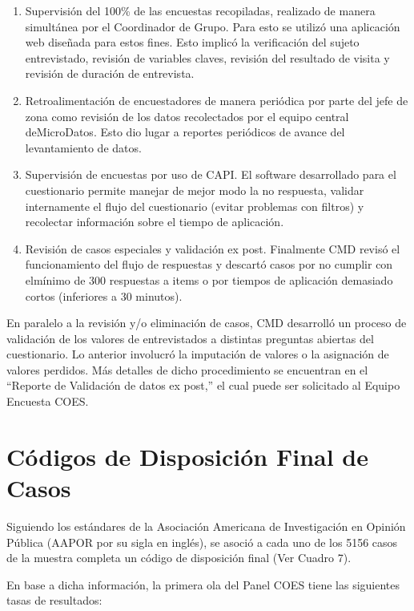 \documentclass[
]{book}
\begin{document}
\begin{enumerate}
\def\labelenumi{\arabic{enumi}.}
\item
  Supervisión del 100\% de las encuestas recopiladas, realizado de
  manera simultánea por el Coordinador de Grupo. Para esto se utilizó
  una aplicación web diseñada para estos fines. Esto implicó la
  verificación del sujeto entrevistado, revisión de variables claves,
  revisión del resultado de visita y revisión de duración de entrevista.
\item
  Retroalimentación de encuestadores de manera periódica por parte del
  jefe de zona como revisión de los datos recolectados por el equipo
  central deMicroDatos. Esto dio lugar a reportes periódicos de avance
  del levantamiento de datos.
\item
  Supervisión de encuestas por uso de CAPI. El software desarrollado
  para el cuestionario permite manejar de mejor modo la no respuesta,
  validar internamente el flujo del cuestionario (evitar problemas con
  filtros) y recolectar información sobre el tiempo de aplicación.
\item
  Revisión de casos especiales y validación ex post. Finalmente CMD
  revisó el funcionamiento del flujo de respuestas y descartó casos por
  no cumplir con elmínimo de 300 respuestas a items o por tiempos de
  aplicación demasiado cortos (inferiores a 30 minutos).
\end{enumerate}

En paralelo a la revisión y/o eliminación de casos, CMD desarrolló un
proceso de validación de los valores de entrevistados a distintas
preguntas abiertas del cuestionario. Lo anterior involucró la imputación
de valores o la asignación de valores perdidos. Más detalles de dicho
procedimiento se encuentran en el ``Reporte de Validación de datos ex
post,'' el cual puede ser solicitado al Equipo Encuesta COES.

\hypertarget{cuxf3digos-de-disposiciuxf3n-final-de-casos}{%
\section{Códigos de Disposición Final de
Casos}\label{cuxf3digos-de-disposiciuxf3n-final-de-casos}}

Siguiendo los estándares de la Asociación Americana de Investigación en
Opinión Pública (AAPOR por su sigla en inglés), se asoció a cada uno de
los 5156 casos de la muestra completa un código de disposición final
(Ver Cuadro 7).

En base a dicha información, la primera ola del Panel COES tiene las
siguientes tasas de resultados:
\end{document}
